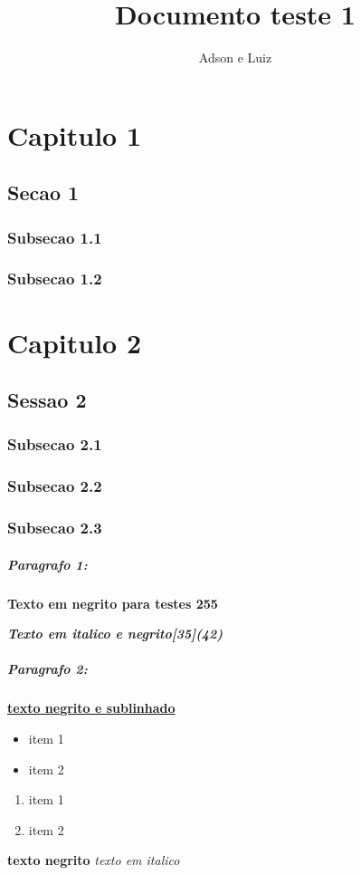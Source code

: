 \documentclass{article}
\author{Adson e Luiz}
\title{Documento teste 1}
\begin{document}

\chapter{Capitulo 1}

\section{Secao 1}

\subsection{Subsecao 1.1}

\subsection{Subsecao 1.2}

\chapter{Capitulo 2}

\section{Sessao 2}

\subsection{Subsecao 2.1}

\subsection{Subsecao 2.2}

\subsection{Subsecao 2.3}

\paragraph{Paragrafo 1:}

\bf{Texto em negrito para testes 255}	

\em{\bf{Texto em italico e negrito[35](42)}}


\paragraph{Paragrafo 2:}

\underline{\bf{texto negrito e sublinhado}}

\begin{itemize}
\item item 1
\item item 2
\end{itemize}

\begin{enumerate}
\item item 1
\item item 2
\end{enumerate}

{\bf texto negrito}
{\it texto em italico}
\end{document}
